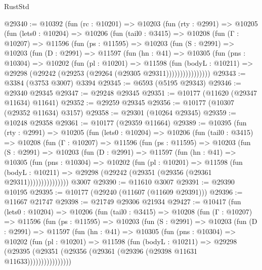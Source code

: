 \begin{lexlean}{RustStd}
\begin{coremodule}
@29340 := @10392
    (fun (rc : @10201) =>
    @10203
      (fun (rty : @2991) =>
      @10205
        (fun (lets0 : @10204) =>
        @10206
          (fun (tail0 : @3415) =>
          @10208
            (fun (Γ : @10207) =>
            @11596
              (fun (ps : @11595) =>
              @10203
                (fun (S : @2991) =>
                @10203
                  (fun (D : @2991) =>
                  @11597
                    (fun (hn : @41) =>
                    @10305
                      (fun (pns : @10304) =>
                      @10202
                        (fun (pl : @10201) =>
                        @11598
                          (fun (bodyL : @10211) =>
                          @29298 (@29242 (@29253 (@29264 (@29305 @29311))))))))))))))))
@29343 := @3384 (@3753 @3007) @3394
@29345 := @6593 (@5195 @29343)
@29346 := @29340 @29345
@29347 := @29248 @29345
@29351 := @10177 (@11620 (@29347 @11634) @11641)
@29352 := @29259 @29345
@29356 := @10177 (@10307 (@29352 @11634) @3157)
@29358 := @29301 (@10264 @29345)
@29359 := @10248 @29358
@29361 := @10177 (@29359 @11664)
@29389 := @10395
    (fun (rty : @2991) =>
    @10205
      (fun (lets0 : @10204) =>
      @10206
        (fun (tail0 : @3415) =>
        @10208
          (fun (Γ : @10207) =>
          @11596
            (fun (ps : @11595) =>
            @10203
              (fun (S : @2991) =>
              @10203
                (fun (D : @2991) =>
                @11597
                  (fun (hn : @41) =>
                  @10305
                    (fun (pns : @10304) =>
                    @10202
                      (fun (pl : @10201) =>
                      @11598
                        (fun (bodyL : @10211) =>
                        @29298 (@29242 (@29351 (@29356 (@29361 @29311)))))))))))))))
    @3007
@29390 := @11610 @3007
@29391 := @29390 @10195
@29395 := @10177 (@29240 (@11607 (@11609 @29391)))
@29396 := @11667 @21747
@29398 := @21749 @29306 @21934
@29427 := @10417
    (fun (lets0 : @10204) =>
    @10206
      (fun (tail0 : @3415) =>
      @10208
        (fun (Γ : @10207) =>
        @11596
          (fun (ps : @11595) =>
          @10203
            (fun (S : @2991) =>
            @10203
              (fun (D : @2991) =>
              @11597
                (fun (hn : @41) =>
                @10305
                  (fun (pns : @10304) =>
                  @10202
                    (fun (pl : @10201) =>
                    @11598
                      (fun (bodyL : @10211) =>
                      @29298
                        (@29395
                          (@29351 (@29356 (@29361 (@29396 (@29398 @11631 @11633))))))))))))))))

\end{coremodule}
\end{lexlean}
